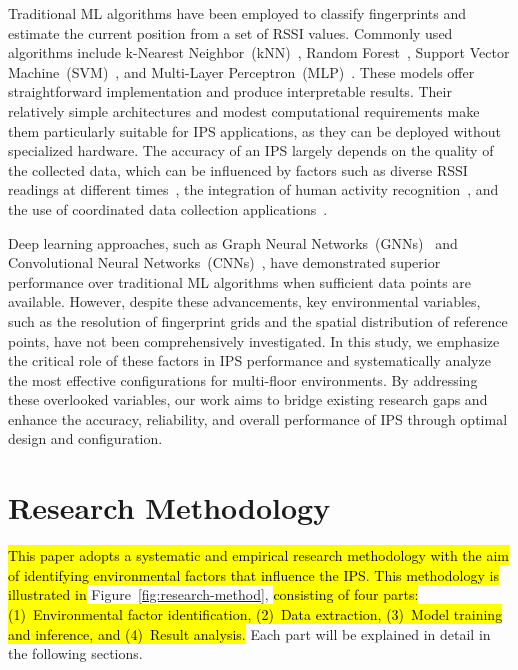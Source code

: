\documentclass[runningheads]{llncs}
\newcommand{\hlgreen}[1]{\sethlcolor{lightgreen}\hl{#1}}
\begin{document}
Traditional ML algorithms have been employed to classify fingerprints and estimate the current position from a set of RSSI values. Commonly used algorithms include k-Nearest Neighbor~(kNN)~\cite{LRE1,LRE2,LRE6}, Random Forest~\cite{LRE1,LRE5,LRE6}, Support Vector Machine~(SVM)~\cite{add1,LRE1,LRE2,LRE6}, and Multi-Layer Perceptron~(MLP)~\cite{LRE1,LRE2}. These models offer straightforward implementation and produce interpretable results. Their relatively simple architectures and modest computational requirements make them particularly suitable for IPS applications, as they can be deployed without specialized hardware. The accuracy of an IPS largely depends on the quality of the collected data, which can be influenced by factors such as diverse RSSI readings at different times~\cite{LRE3}, the integration of human activity recognition~\cite{LRE4}, and the use of coordinated data collection applications~\cite{LRE7}.

Deep learning approaches, such as Graph Neural Networks~(GNNs)~\cite{LRE2} and Convolutional Neural Networks~(CNNs)~\cite{LRE4}, have demonstrated superior performance over traditional ML algorithms when sufficient data points are available. However, despite these advancements, key environmental variables, such as the resolution of fingerprint grids and the spatial distribution of reference points, have not been comprehensively investigated. In this study, we emphasize the critical role of these factors in IPS performance and systematically analyze the most effective configurations for multi-floor environments. By addressing these overlooked variables, our work aims to bridge existing research gaps and enhance the accuracy, reliability, and overall performance of IPS through optimal design and configuration.


\section{Research Methodology}\label{sec:research-method}

\hlgreen{This paper adopts a systematic and empirical research methodology with the aim of identifying environmental factors that influence the IPS. This methodology is illustrated in} Figure~\ref{fig:research-method}, \hlgreen{consisting of four parts: (1)~Environmental factor identification, (2)~Data extraction, (3)~Model training and inference, and (4)~Result analysis.} Each part will be explained in detail in the following sections.
\end{document}

